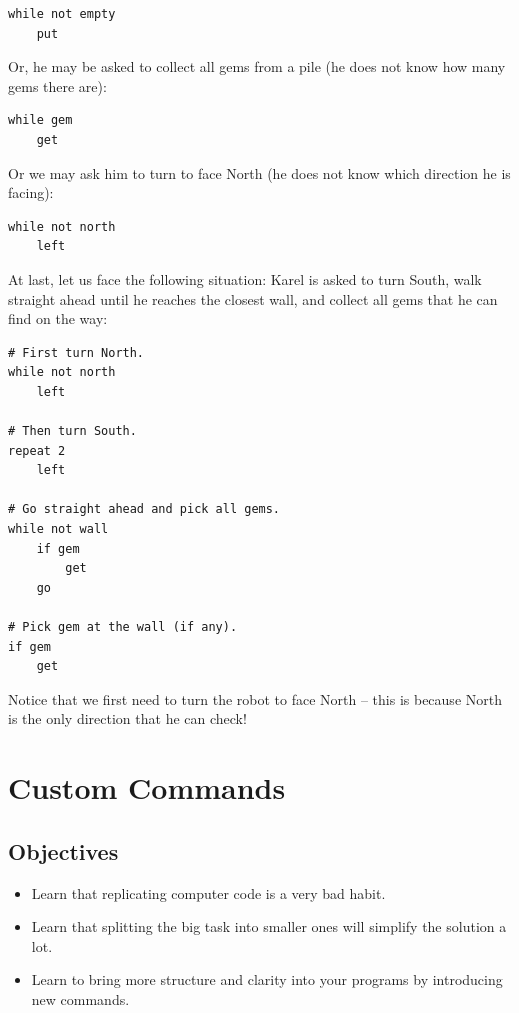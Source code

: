 \begin{verbatim}
while not empty
    put
\end{verbatim}
Or, he may be asked to collect all gems from a pile (he does not know 
how many gems there are):

\begin{verbatim}
while gem
    get
\end{verbatim}
Or we may ask him to turn to face North (he does not know which direction he is
facing):

\begin{verbatim}
while not north
    left
\end{verbatim}
At last, let us face the following situation: Karel is asked to 
turn South, walk straight ahead until he reaches the closest wall, and 
collect all gems that he can find on the way:

\begin{verbatim}
# First turn North.
while not north
    left

# Then turn South.
repeat 2
    left

# Go straight ahead and pick all gems.
while not wall
    if gem
        get
    go

# Pick gem at the wall (if any).
if gem
    get
\end{verbatim}
Notice that we first need to turn the robot to face North -- this is because North 
is the only direction that he can check!



\section{Custom Commands} \label{sec:newcom}

\subsection{Objectives} 
 
\begin{itemize}
\item Learn that replicating computer code is a very bad habit.
\item Learn that splitting the big task into smaller ones will simplify the solution a lot. 
\item Learn to bring more structure and clarity into your programs by introducing new commands.
\end{itemize}

